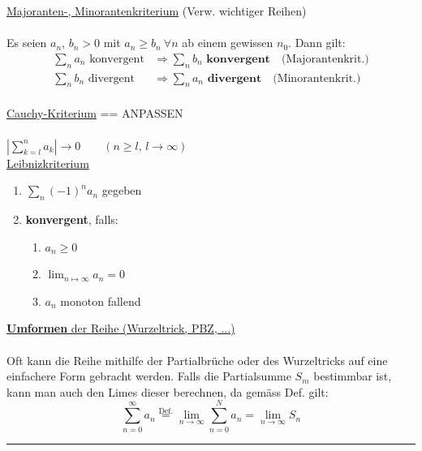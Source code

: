 \documentclass[6pt]{article}
\begin{document}
\begin{multicols*}{3}
	\underline{Majoranten-, Minorantenkriterium} (Verw. wichtiger Reihen) \\
	\vspace{-2mm}\\
	Es seien $a_n$, $b_n > 0$ mit $a_n \geq b_n\ \forall n$ ab einem gewissen $n_0$. Dann gilt: 
	\begin{equation*}
		\begin{split}
			\sum_n a_n \text{ konvergent} & \Rightarrow \sum_n b_n \textbf{ konvergent}\quad \text{(Majorantenkrit.)} \\
			\sum_n b_n \text{ divergent} & \Rightarrow \sum_n a_n \textbf{ divergent}\quad \text{(Minorantenkrit.)} \\
		\end{split}
	\end{equation*}
	
	\underline{Cauchy-Kriterium}  == ANPASSEN\\
	\vspace{-1mm}\\
	$\left| \sum_{k=l}^n a_k \right| \to 0 \qquad (n \geq l, \, l \to \infty)$
	\vspace{0mm}\\
	
	
	\underline{Leibnizkriterium} \\
	\vspace{-5mm}
	\begin{enumerate}
		\item $\sum_n (-1)^n a_n$ gegeben
		\item \textbf{konvergent}, falls:
		\begin{enumerate}
			\item $a_n \geq 0$
			\item $\lim_{n\mapsto\infty} a_n = 0$
			\item $a_n$ monoton fallend
		\end{enumerate}
	\end{enumerate}
	\vspace{3mm}
	
	\underline{{\bf Umformen} der Reihe (Wurzeltrick, PBZ, ...)} \\
	\vspace{-2mm}\\
	Oft kann die Reihe mithilfe der Partialbr{\"u}che oder des Wurzeltricks auf eine einfachere Form gebracht werden. Falls die Partialsumme $S_m$ bestimmbar ist, kann man auch den Limes dieser berechnen, da gem{\"a}ss Def. gilt:
	\begin{equation*}
					\sum_{n=0}^\infty a_n \overset{\text{Def.}}= \lim\limits_{n \to \infty} \sum_{n=0}^N a_n = \lim\limits_{n \to \infty} S_n
	\end{equation*}
	\vspace{2mm}
  		\noindent\textcolor{gray}{\rule{9cm}{0.1pt}}
	\vspace{-8mm}\\
	


\end{multicols*}
\end{document}
